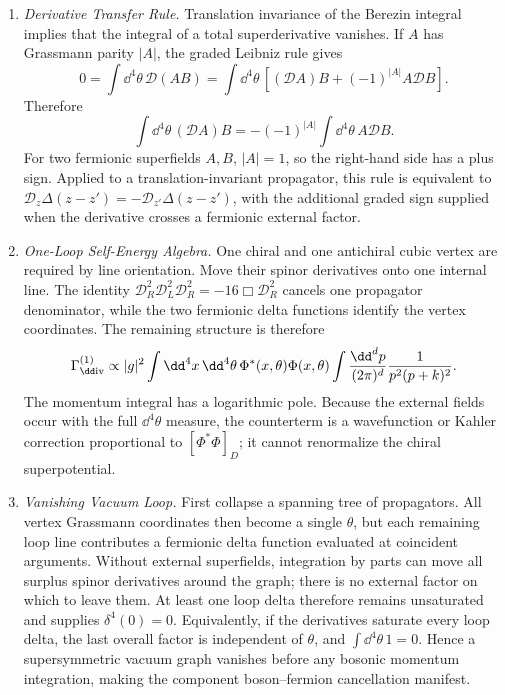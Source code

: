 \begin{enumerate}
  \begin{enumerate}
    \item \emph{Derivative Transfer Rule.}
    Translation invariance of the Berezin integral implies that the
      integral of a total superderivative vanishes.  If \(A\) has Grassmann
      parity \(|A|\), the graded Leibniz rule gives
      \[
        0=\int \dd^4\theta\,\mathcal D(AB)
         =\int \dd^4\theta\,
           \left[(\mathcal DA)B+(-1)^{|A|}A\mathcal DB\right].
      \]
      Therefore
      \[
        \int \dd^4\theta\,(\mathcal DA)B
          =-(-1)^{|A|}\int \dd^4\theta\,A\mathcal DB .
      \]
      For two fermionic superfields \(A,B\), \(|A|=1\), so the right-hand
      side has a plus sign.  Applied to a translation-invariant propagator,
      this rule is equivalent to
      \(\mathcal D_z\Delta(z-z')=-\mathcal D_{z'}\Delta(z-z')\), with the
      additional graded sign supplied when the derivative crosses a
      fermionic external factor.
    \item \emph{One-Loop Self-Energy Algebra.}
    One chiral and one antichiral cubic vertex are required by line
      orientation.  Move their spinor derivatives onto one internal line.
      The identity
      \(\mathcal D_R^2\mathcal D_L^2\mathcal D_R^2
      =-16\Box\mathcal D_R^2\) cancels one propagator denominator, while the
      two fermionic delta functions identify the vertex coordinates.  The
      remaining structure is therefore
      \[
        \Gamma_{\rm \dd iv}^{(1)}
          \propto |g|^2
          \int \dd^4x\,\dd^4\theta\,\Phi^*(x,\theta)\Phi(x,\theta)
          \int\frac{\dd^dp}{(2\pi)^d}
            \frac1{p^2(p+k)^2}.
      \]
      The momentum integral has a logarithmic pole.  Because the external
      fields occur with the full \(\dd^4\theta\) measure, the counterterm is a
      wavefunction or Kahler correction proportional to
      \([\Phi^*\Phi]_D\); it cannot renormalize the chiral superpotential.
    \item \emph{Vanishing Vacuum Loop.}
    First collapse a spanning tree of propagators.  All vertex Grassmann
      coordinates then become a single \(\theta\), but each remaining loop
      line contributes a fermionic delta function evaluated at coincident
      arguments.  Without external superfields, integration by parts can
      move all surplus spinor derivatives around the graph; there is no
      external factor on which to leave them.  At least one loop delta
      therefore remains unsaturated and supplies
      \(\delta^4(0)=0\).  Equivalently, if the derivatives saturate every
      loop delta, the last overall factor is independent of \(\theta\), and
      \(\int \dd^4\theta\,1=0\).  Hence a supersymmetric vacuum graph vanishes
      before any bosonic momentum integration, making the component
      boson--fermion cancellation manifest.
  \end{enumerate}


\end{enumerate}
